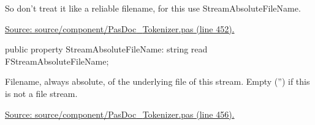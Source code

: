 \documentclass{report}
\newif\ifpdf
\begin{document}
\begin{list}{}
So don't treat it like a reliable filename, for this use StreamAbsoluteFileName.\par
\href{https://github.com/pasdoc/pasdoc/blob/master/source/component/PasDoc_Tokenizer.pas#L452}{Source: source/component/PasDoc{\_}Tokenizer.pas (line 452).}\label{PasDoc_Tokenizer.TTokenizer-StreamAbsoluteFileName}
\item[\textbf{StreamAbsoluteFileName}\hfill]
\ifpdf
\begin{flushleft}
\fi
\begin{ttfamily}
public property StreamAbsoluteFileName: string read FStreamAbsoluteFileName;\end{ttfamily}

\ifpdf
\end{flushleft}
\fi


\par Filename, always absolute, of the underlying file of this stream. Empty ('') if this is not a file stream.\par
\href{https://github.com/pasdoc/pasdoc/blob/master/source/component/PasDoc_Tokenizer.pas#L456}{Source: source/component/PasDoc{\_}Tokenizer.pas (line 456).}\end{list}
\end{document}
